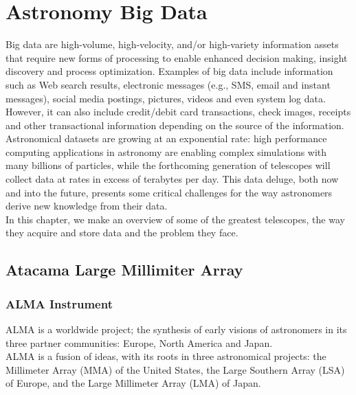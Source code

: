 \chapter{Astronomy Big Data}


Big data are high-volume, high-velocity, and/or high-variety information assets that require new forms of processing to enable enhanced decision making, insight discovery and process optimization. Examples of big data include information such as Web search results, electronic messages (e.g., SMS, email and instant messages), social media postings, pictures, videos and even system log data.  However, it can also include credit/debit card transactions, check images, receipts and other transactional information depending on the source of the information. \\

Astronomical datasets are growing at an exponential rate: high performance computing applications in astronomy are enabling complex simulations with many billions of particles, while the forthcoming generation of telescopes will collect data at rates in excess of terabytes per day. This data deluge, both now and into the future, presents some critical challenges for the way astronomers derive new knowledge from their data.\\

In this chapter, we make an overview of some of the greatest telescopes, the way they acquire and store data and the problem they face.


\section{Atacama Large Millimiter Array}

\subsection{ALMA Instrument}

ALMA is a worldwide project; the synthesis of early visions of astronomers in its three partner communities: Europe, North America and Japan.\\

ALMA is a fusion of ideas, with its roots in three astronomical projects: the Millimeter Array (MMA) of the United States, the Large Southern Array (LSA) of Europe, and the Large Millimeter Array (LMA) of Japan.\\


